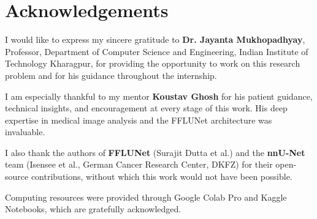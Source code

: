 \documentclass[12pt,a4paper]{report}
\begin{document}
\chapter*{Acknowledgements}

I would like to express my sincere gratitude to \textbf{Dr. Jayanta Mukhopadhyay}, Professor, Department of Computer Science and Engineering, Indian Institute of Technology Kharagpur, for providing the opportunity to work on this research problem and for his guidance throughout the internship.

I am especially thankful to my mentor \textbf{Koustav Ghosh} for his patient guidance, technical insights, and encouragement at every stage of this work. His deep expertise in medical image analysis and the FFLUNet architecture was invaluable.

I also thank the authors of \textbf{FFLUNet} (Surajit Dutta et al.) and the \textbf{nnU-Net} team (Isensee et al., German Cancer Research Center, DKFZ) for their open-source contributions, without which this work would not have been possible.

Computing resources were provided through Google Colab Pro and Kaggle Notebooks, which are gratefully acknowledged.
\end{document}
